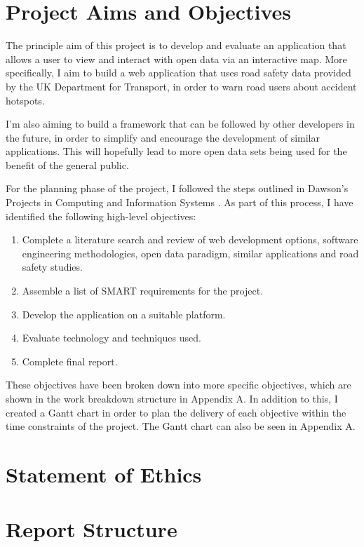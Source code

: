 \documentclass[authoryearcitations]{UoYCSproject}
\begin{document}

\section{Project Aims and Objectives}

The principle aim of this project is to develop and evaluate an application that allows a user to view and interact with open data via an interactive map. More specifically, I aim to build a web application that uses road safety data provided by the UK Department for Transport, in order to warn road users about accident hotspots.

I'm also aiming to build a framework that can be followed by other developers in the future, in order to simplify and encourage the development of similar applications. This will hopefully lead to more open data sets being used for the benefit of the general public.

For the planning phase of the project, I followed the steps outlined in Dawson's Projects in Computing and Information Systems \citep{Dawson2009}. As part of this process, I have identified the following high-level objectives:
\begin{enumerate}
	\item Complete a literature search and review of web development options, software engineering methodologies, open data paradigm, similar applications and road safety studies.
	\item Assemble a list of SMART requirements for the project.
	\item Develop the application on a suitable platform.
	\item Evaluate technology and techniques used.
	\item Complete final report.
\end{enumerate}

These objectives have been broken down into more specific objectives, which are shown in the work breakdown structure in Appendix A. In addition to this, I created a Gantt chart in order to plan the delivery of each objective within the time constraints of the project. The Gantt chart can also be seen in Appendix A. 


\section{Statement of Ethics}

\section{Report Structure}
\end{document}
